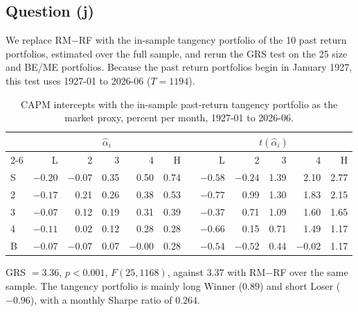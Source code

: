 \subsection{Question (j)}

We replace RM$-$RF with the in-sample tangency portfolio of the 10 past
return portfolios, estimated over the full sample, and rerun the GRS test on
the 25 size and BE/ME portfolios. Because the past return portfolios begin in
January 1927, this test uses 1927-01 to 2026-06 ($T = 1194$).

\begin{table}[H]
\centering
\caption{CAPM intercepts with the in-sample past-return tangency portfolio
as the market proxy, percent per month, 1927-01 to 2026-06.}
\small
\begin{tabular}{lrrrrrcrrrrr}
\toprule
& \multicolumn{5}{c}{$\hat\alpha_i$} && \multicolumn{5}{c}{$t(\hat\alpha_i)$} \\
\cmidrule{2-6}\cmidrule{8-12}
& L & 2 & 3 & 4 & H && L & 2 & 3 & 4 & H \\
\midrule
S & $-0.20$ & $-0.07$ & 0.35 & 0.50 & 0.74 && $-0.58$ & $-0.24$ & 1.39 & 2.10 & 2.77 \\
2 & $-0.17$ & 0.21 & 0.26 & 0.38 & 0.53 && $-0.77$ & 0.99 & 1.30 & 1.83 & 2.15 \\
3 & $-0.07$ & 0.12 & 0.19 & 0.31 & 0.39 && $-0.37$ & 0.71 & 1.09 & 1.60 & 1.65 \\
4 & $-0.11$ & 0.02 & 0.12 & 0.28 & 0.28 && $-0.66$ & 0.15 & 0.71 & 1.49 & 1.17 \\
B & $-0.07$ & $-0.07$ & 0.07 & $-0.00$ & 0.28 && $-0.54$ & $-0.52$ & 0.44 & $-0.02$ & 1.17 \\
\bottomrule
\end{tabular}
\label{tab:p3j}
\vspace{2pt}\begin{minipage}{0.93\textwidth}\footnotesize
GRS $= 3.36$, $p < 0.001$, $F(25, 1168)$, against $3.37$ with RM$-$RF over
the same sample. The tangency portfolio is mainly long Winner ($0.89$) and
short Loser ($-0.96$), with a monthly Sharpe ratio of $0.264$.
\end{minipage}
\end{table}

